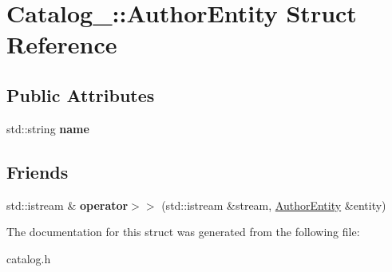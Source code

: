 \hypertarget{struct_catalog___1_1_author_entity}{}\section{Catalog\+\_\+\+:\+:Author\+Entity Struct Reference}
\label{struct_catalog___1_1_author_entity}
\subsection*{Public Attributes}
\begin{DoxyCompactItemize}
\item 
std\+::string {\bfseries name}\hypertarget{struct_catalog___1_1_author_entity_adb0134112ae346a56aaf02777d3e8fbf}{}\label{struct_catalog___1_1_author_entity_adb0134112ae346a56aaf02777d3e8fbf}

\end{DoxyCompactItemize}
\subsection*{Friends}
\begin{DoxyCompactItemize}
\item 
std\+::istream \& {\bfseries operator$>$$>$} (std\+::istream \&stream, \hyperlink{struct_catalog___1_1_author_entity}{Author\+Entity} \&entity)\hypertarget{struct_catalog___1_1_author_entity_ad6ab10df7184c0f542e5dda14fdce3a0}{}\label{struct_catalog___1_1_author_entity_ad6ab10df7184c0f542e5dda14fdce3a0}

\end{DoxyCompactItemize}


The documentation for this struct was generated from the following file\+:\begin{DoxyCompactItemize}
\item 
catalog.\+h\end{DoxyCompactItemize}
